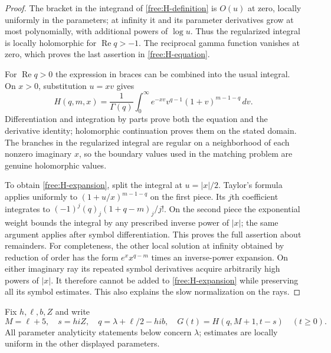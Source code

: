 \begin{proof}
The bracket in the integrand of \eqref{free:H-definition} is $O(u)$ at
zero, locally uniformly in the parameters; at infinity it and its
parameter derivatives grow at most polynomially, with additional powers
of $\log u$.  Thus the regularized integral is locally holomorphic for
$\operatorname{Re}q>-1$.  The reciprocal gamma function vanishes at zero,
which proves the last assertion in \eqref{free:H-equation}.

For $\operatorname{Re}q>0$ the expression in braces can be combined into
the usual integral.  On $x>0$, substitution $u=xv$ gives
\[
 H(q,m,x)=\frac1{\Gamma(q)}\int_0^\infty
 e^{-xv}v^{q-1}(1+v)^{m-1-q}\,dv.
\]
Differentiation and integration by parts prove both the equation and the
derivative identity; holomorphic continuation proves them on the stated
domain.  The branches in the regularized integral are regular on a
neighborhood of each nonzero imaginary $x$, so the boundary values used
in the matching problem are genuine holomorphic values.

To obtain \eqref{free:H-expansion}, split the integral at $u=|x|/2$.
Taylor's formula applies uniformly to $(1+u/x)^{m-1-q}$ on the first
piece.  Its $j$th coefficient integrates to
$(-1)^j(q)_j(1+q-m)_j/j!$.  On the second piece the exponential weight
bounds the integral by any prescribed inverse power of $|x|$; the same
argument applies after symbol differentiation.  This proves the full
assertion about remainders.  For completeness, the other local solution
at infinity obtained by reduction of order has the form
$e^xx^{q-m}$ times an inverse-power expansion.  On either imaginary ray
its repeated symbol derivatives acquire arbitrarily high powers of
$|x|$.  It therefore cannot be added to \eqref{free:H-expansion} while
preserving all its symbol estimates.  This also explains the slow
normalization on the rays.
\end{proof}

Fix $h,\ell,b,Z$ and write
\[
 M=\ell+5,\quad s=hiZ,\quad q=\lambda+\ell/2-hi b,
 \quad G(t)=H(q,M+1,t-s)\quad(t\ge0).
\]
All parameter analyticity statements below concern $\lambda$; estimates
are locally uniform in the other displayed parameters.

